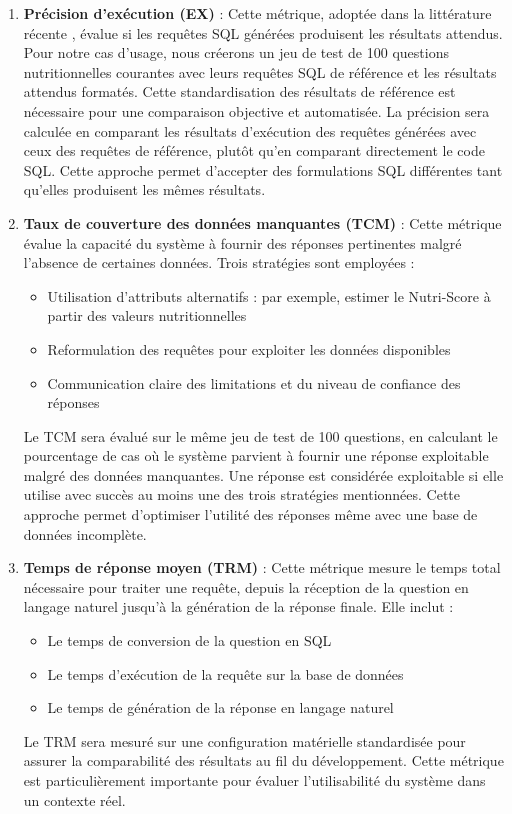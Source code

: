 \documentclass[a4paper,11pt]{article}
\begin{document}
\begin{enumerate}
   \item \textbf{Précision d'exécution (EX)} : Cette métrique, adoptée dans la littérature récente \citep{li2024can}, 
évalue si les requêtes SQL générées produisent les résultats attendus. Pour notre cas d'usage, nous créerons un jeu 
de test de 100 questions nutritionnelles courantes avec leurs requêtes SQL de référence et les résultats attendus formatés. 
Cette standardisation des résultats de référence est nécessaire pour une comparaison objective et automatisée. La précision 
sera calculée en comparant les résultats d'exécution des requêtes générées avec ceux des requêtes de référence, plutôt 
qu'en comparant directement le code SQL. Cette approche permet d'accepter des formulations SQL différentes tant qu'elles 
produisent les mêmes résultats.

   \item \textbf{Taux de couverture des données manquantes (TCM)} : Cette métrique évalue la capacité du système à fournir des réponses pertinentes malgré l'absence de certaines données. Trois stratégies sont employées :
   \begin{itemize}
       \item Utilisation d'attributs alternatifs : par exemple, estimer le Nutri-Score à partir des valeurs nutritionnelles
       \item Reformulation des requêtes pour exploiter les données disponibles
       \item Communication claire des limitations et du niveau de confiance des réponses
   \end{itemize}
   Le TCM sera évalué sur le même jeu de test de 100 questions, en calculant le pourcentage de cas où le système parvient 
   à fournir une réponse exploitable malgré des données manquantes. Une réponse est considérée exploitable si elle utilise 
   avec succès au moins une des trois stratégies mentionnées. Cette approche permet d'optimiser l'utilité des réponses 
   même avec une base de données incomplète.

   \item \textbf{Temps de réponse moyen (TRM)} : Cette métrique mesure le temps total nécessaire pour traiter une requête, depuis la réception de la question en langage naturel jusqu'à la génération de la réponse finale. Elle inclut :
   \begin{itemize}
       \item Le temps de conversion de la question en SQL
       \item Le temps d'exécution de la requête sur la base de données
       \item Le temps de génération de la réponse en langage naturel
   \end{itemize}
   Le TRM sera mesuré sur une configuration matérielle standardisée pour assurer la comparabilité des résultats au fil 
   du développement. Cette métrique est particulièrement importante pour évaluer l'utilisabilité du système dans un 
   contexte réel.
\end{enumerate}
\end{document}
